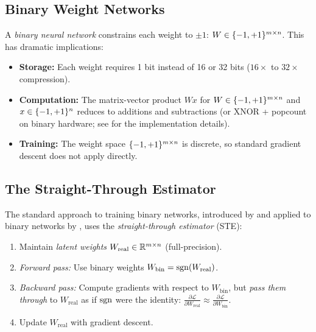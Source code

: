 \subsection{Binary Weight Networks}\label{sec:binary-weights}

A \emph{binary neural network} constrains each weight to $\pm 1$:
$W \in \{-1,+1\}^{m \times n}$. This has dramatic implications:
\begin{itemize}
  \item \textbf{Storage:} Each weight requires 1 bit instead of 16 or 32
    bits ($16\times$ to $32\times$ compression).
  \item \textbf{Computation:} The matrix-vector product $Wx$ for
    $W \in \{-1,+1\}^{m \times n}$ and $x \in \{-1,+1\}^n$ reduces to
    additions and subtractions (or XNOR + popcount on binary hardware;
    see \citealp{rastegari2016xnor} for the implementation details).
  \item \textbf{Training:} The weight space $\{-1,+1\}^{m \times n}$ is
    discrete, so standard gradient descent does not apply directly.
\end{itemize}

\subsection{The Straight-Through Estimator}\label{sec:ste}

The standard approach to training binary networks, introduced by
\citet{bengio2013estimating} and applied to binary networks by
\citet{courbariaux2015binaryconnect}, uses the
\emph{straight-through estimator} (STE):

\begin{enumerate}
  \item Maintain \emph{latent weights} $W_{\text{real}} \in \mathbb{R}^{m \times n}$
    (full-precision).
  \item \emph{Forward pass:} Use binary weights
    $W_{\text{bin}} = \operatorname{sgn}(W_{\text{real}})$.
  \item \emph{Backward pass:} Compute gradients with respect to
    $W_{\text{bin}}$, but \emph{pass them through} to $W_{\text{real}}$
    as if $\operatorname{sgn}$ were the identity:
    $\frac{\partial \mathcal{L}}{\partial W_{\text{real}}} \approx \frac{\partial \mathcal{L}}{\partial W_{\text{bin}}}$.
  \item Update $W_{\text{real}}$ with gradient descent.
\end{enumerate}

